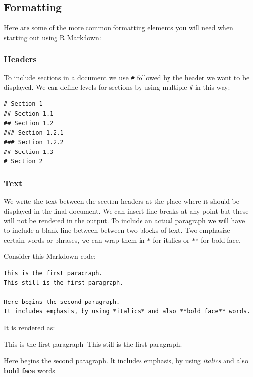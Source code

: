 \documentclass[
]{book}
\begin{document}
\hypertarget{formatting}{%
\subsection{Formatting}\label{formatting}}

Here are some of the more common formatting elements you will need when starting out using R Markdown:

\hypertarget{headers}{%
\subsubsection{Headers}\label{headers}}

To include sections in a document we use \texttt{\#} followed by the header we want to be displayed. We can define levels for sections by using multiple \texttt{\#} in this way:

\begin{verbatim}
# Section 1
## Section 1.1
## Section 1.2
### Section 1.2.1
### Section 1.2.2
## Section 1.3
# Section 2
\end{verbatim}

\hypertarget{text}{%
\subsubsection{Text}\label{text}}

We write the text between the section headers at the place where it should be displayed in the final document. We can insert line breaks at any point but these will not be rendered in the output. To include an actual paragraph we will have to include a blank line between between two blocks of text. Two emphasize certain words or phrases, we can wrap them in \texttt{*} for italics or \texttt{**} for bold face.

Consider this Markdown code:

\begin{verbatim}
This is the first paragraph.
This still is the first paragraph.

Here begins the second paragraph.
It includes emphasis, by using *italics* and also **bold face** words.
\end{verbatim}

It is rendered as:

This is the first paragraph. This still is the first paragraph.

Here begins the second paragraph. It includes emphasis, by using \emph{italics} and also \textbf{bold face} words.
\end{document}
